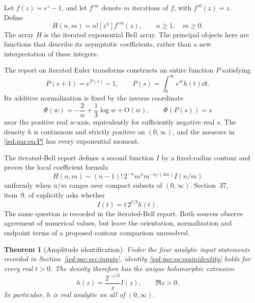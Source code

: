 \documentclass[11pt,letterpaper]{article}
\newtheorem{theorem}{Theorem}[section]
\theoremstyle{remark}\newtheorem{remark}[theorem]{Remark}
\newcommand{\Oh}{\mathrm O}\newcommand{\supp}{\operatorname{supp}}
\newcommand{\coef}[1]{[z^{#1}]}
\begin{document}
Let $f(z)=e^z-1$, and let $f^{\circ m}$ denote $m$ iterations of $f$,
with $f^{\circ0}(z)=z$. Define
\begin{equation}\label{ied:par:eq:H}
 H(n,m)=n!\coef n f^{\circ m}(z),\qquad n\ge1,\quad m\ge0.
\end{equation}
The array $H$ is the iterated exponential Bell array.
The principal objects here are functions that describe its asymptotic
coefficients, rather than a new interpretation of these integers.

The report on iterated Euler transforms \cite{Euler} constructs an
entire function $P$ satisfying
\begin{equation}\label{ied:par:eq:P}
 P(s+1)=e^{P(s)}-1,\qquad
 P(s)=\int_0^\infty e^{st}h(t)\dd t.
\end{equation}
Its additive normalization is fixed by the inverse coordinate
\begin{equation}\label{ied:par:eq:Phi}
 \Phi(w)=-\frac2w+\frac13\log w+\Oh(w),\qquad \Phi(P(s))=s
\end{equation}
near the positive real $w$-axis, equivalently for sufficiently negative
real $s$. The density $h$ is continuous and strictly positive on
$(0,\infty)$, and the measure in \eqref{ied:par:eq:P} has every exponential moment.

The iterated-Bell report \cite{IBD} defines a second function $I$
by a fixed-radius contour and proves the local coefficient formula
\begin{equation}\label{ied:par:eq:Bellshape}
 H(n,m)\sim(n-1)!\,2^{-n}m^n m^{-n/(3m)}I(n/m)
\end{equation}
uniformly when $n/m$ ranges over compact subsets of $(0,\infty)$.
Section~37, item~9, of \cite{Euler} explicitly asks whether
\begin{equation}\label{ied:par:eq:mainidentity}
 I(t)=t\,2^{t/3}h(t).
\end{equation}
The same question is recorded in the iterated-Bell report. Both sources
observe agreement of numerical values, but leave the orientation,
normalization and endpoint terms of a proposed contour comparison
unresolved.

\begin{theorem}[Amplitude identification]\label{ied:par:thm:identity}
Under the four analytic input statements recorded in
Section~\ref{ied:par:sec:inputs}, identity \eqref{ied:par:eq:mainidentity} holds for every
real $t>0$. The density therefore has the unique holomorphic extension
\begin{equation}\label{ied:par:eq:hhol}
 h(z)=\frac{2^{-z/3}}{z}I(z),\qquad\Re z>0.
\end{equation}
In particular, $h$ is real analytic on all of $(0,\infty)$.
\end{theorem}
\end{document}
